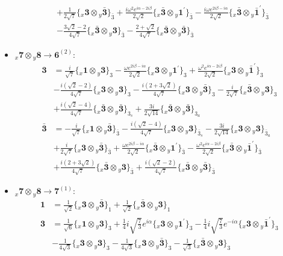 \documentclass[english]{article}
\newcommand{\rep}[1]{\mathbf{#1}}
\newcommand{\repx}[2]{{}_{#2}\mathbf{#1}}
\newcommand{\tsprodx}[2]{\repx{#1}{x}\otimes\repx{#2}{y}}
\newcommand{\subcgt}[3]{\big\{ \tsprodx{#1}{#2}\big\}^{}_{#3}}
\begin{document}
\begin{itemize}
\begin{align*}
 & +\frac{1}{2 \sqrt{7}}\subcgt{3}{\bar{3}}{\bar{3}}+\frac{i \omega ^2 e^{i \alpha -2 i \beta }}{2 \sqrt{2}}\subcgt{\bar{3}}{1^{\prime}}{\bar{3}}-\frac{i \omega  e^{2 i \beta -i \alpha }}{2 \sqrt{2}}\subcgt{\bar{3}}{\bar{1}^{\prime}}{\bar{3}} \\ 
 & -\frac{3 \sqrt{2}-2}{4 \sqrt{7}}\subcgt{\bar{3}}{3}{\bar{3}}-\frac{2+\sqrt{2}}{4 \sqrt{7}}\subcgt{\bar{3}}{\bar{3}}{\bar{3}}
\end{align*}
\item $\tsprodx{7}{8}\to\rep{6}^{(2)}$:
\begin{align*}
\rep{3} & = \frac{i}{\sqrt{7}}\subcgt{1}{3}{3}-\frac{\omega  e^{2 i \beta -i \alpha }}{2 \sqrt{2}}\subcgt{3}{1^{\prime}}{3}+\frac{\omega ^2 e^{i \alpha -2 i \beta }}{2 \sqrt{2}}\subcgt{3}{\bar{1}^{\prime}}{3} \\ 
 & -\frac{i \left(\sqrt{2}-2\right)}{4 \sqrt{7}}\subcgt{3}{3}{3}-\frac{i \left(2+3 \sqrt{2}\right)}{4 \sqrt{7}}\subcgt{3}{\bar{3}}{3}-\frac{i}{2 \sqrt{7}}\subcgt{\bar{3}}{3}{3} \\ 
 & +\frac{i \left(\sqrt{2}-4\right)}{4 \sqrt{7}}\subcgt{\bar{3}}{\bar{3}}{3_{s}}+\frac{3 i}{2 \sqrt{14}}\subcgt{\bar{3}}{\bar{3}}{3_{a}}
\\
\rep{\bar{3}} & = -\frac{i}{\sqrt{7}}\subcgt{1}{\bar{3}}{\bar{3}}-\frac{i \left(\sqrt{2}-4\right)}{4 \sqrt{7}}\subcgt{3}{3}{\bar{3}_{s}}-\frac{3 i}{2 \sqrt{14}}\subcgt{3}{3}{\bar{3}_{a}} \\ 
 & +\frac{i}{2 \sqrt{7}}\subcgt{3}{\bar{3}}{\bar{3}}+\frac{\omega  e^{2 i \beta -i \alpha }}{2 \sqrt{2}}\subcgt{\bar{3}}{1^{\prime}}{\bar{3}}-\frac{\omega ^2 e^{i \alpha -2 i \beta }}{2 \sqrt{2}}\subcgt{\bar{3}}{\bar{1}^{\prime}}{\bar{3}} \\ 
 & +\frac{i \left(2+3 \sqrt{2}\right)}{4 \sqrt{7}}\subcgt{\bar{3}}{3}{\bar{3}}+\frac{i \left(\sqrt{2}-2\right)}{4 \sqrt{7}}\subcgt{\bar{3}}{\bar{3}}{\bar{3}}
\end{align*}
\item $\tsprodx{7}{8}\to\rep{7}^{(1)}$:
\begin{align*}
\rep{1} & = \frac{1}{\sqrt{2}}\subcgt{3}{\bar{3}}{1}+\frac{1}{\sqrt{2}}\subcgt{\bar{3}}{3}{1}
\\
\rep{3} & = \frac{1}{\sqrt{6}}\subcgt{1}{3}{3}+\frac{1}{4} i \sqrt{\frac{7}{3}} e^{i \alpha }\subcgt{3}{1^{\prime}}{3}-\frac{1}{4} i \sqrt{\frac{7}{3}} e^{-i \alpha }\subcgt{3}{\bar{1}^{\prime}}{3} \\ 
 & -\frac{1}{4 \sqrt{3}}\subcgt{3}{3}{3}-\frac{1}{4 \sqrt{3}}\subcgt{3}{\bar{3}}{3}-\frac{1}{\sqrt{3}}\subcgt{\bar{3}}{3}{3} \\ 

\end{align*}
\end{itemize}
\end{document}

